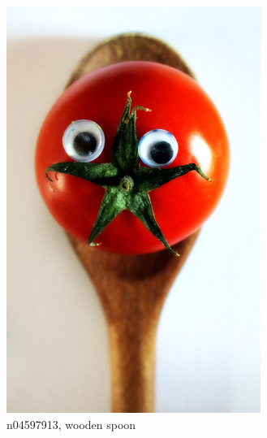 \documentclass[11pt, a4paper]{article}
\begin{document}
\begin{figure}[h!tb]
    \begin{subfigure}[t]{0.30\textwidth}
    		\centering
        \includegraphics[width=\textwidth]{imagenet/examples/n04597913_10021.JPEG}
        \caption{n04597913, wooden spoon}
        \label{fig:imagenet-examples-4}
    \end{subfigure}
    ~ %
    \begin{subfigure}[t]{0.30\textwidth}
    		\centering

\end{subfigure}
\end{figure}
\end{document}
